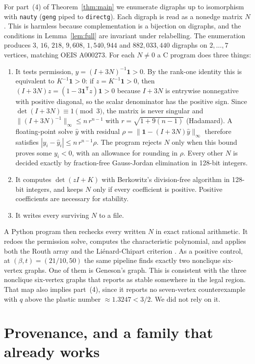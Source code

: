 \documentclass[11pt]{amsart}
\theoremstyle{remark}
\newcommand{\one}{\mathbf 1}
\begin{document}
For part~(4) of Theorem~\ref{thm:main} we enumerate digraphs up to isomorphism with \texttt{nauty} (\texttt{geng} piped to \texttt{directg}). Each digraph is read as a nonedge matrix $N$. This is harmless because complementation is a bijection on digraphs, and the conditions in Lemma~\ref{lem:full} are invariant under relabelling. The enumeration produces $3$, $16$, $218$, $9{,}608$, $1{,}540{,}944$ and $882{,}033{,}440$ digraphs on $2,\dots,7$ vertices, matching OEIS A000273. For each $N\neq0$ a C program does three things:
\begin{enumerate}
\item It tests permission, $y=(I+3N)^{-1}\one>0$. By the rank-one identity this is equivalent to $K^{-1}\one>0$: if $z=K^{-1}\one>0$, then $(I+3N)z=(1-3\one^{\mathsf T}z)\one>0$ because $I+3N$ is entrywise nonnegative with positive diagonal, so the scalar denominator has the positive sign. Since $\det(I+3N)\equiv1\pmod3$, the matrix is never singular and $\|(I+3N)^{-1}\|_\infty\le n\,r^{n-1}$ with $r=\sqrt{1+9(n-1)}$ (Hadamard). A floating-point solve $\hat y$ with residual $\rho=\|\one-(I+3N)\hat y\|_\infty$ therefore satisfies $|y_i-\hat y_i|\le n\,r^{n-1}\rho$. The program rejects $N$ only when this bound proves some $y_i<0$, with an allowance for rounding in $\rho$. Every other $N$ is decided exactly by fraction-free Gauss-Jordan elimination in 128-bit integers.
\item It computes $\det(zI+K)$ with Berkowitz's division-free algorithm \cite{Berkowitz1984} in 128-bit integers, and keeps $N$ only if every coefficient is positive. Positive coefficients are necessary for stability.
\item It writes every surviving $N$ to a file.
\end{enumerate}
A Python program then rechecks every written $N$ in exact rational arithmetic. It redoes the permission solve, computes the characteristic polynomial, and applies both the Routh array and the Li\'enard-Chipart criterion \cite{Gantmacher1959}. \SCANSUMMARY{} As a positive control, at $(\beta,t)=(21/10,50)$ the same pipeline finds exactly two nonclique six-vertex graphs. One of them is Geneson's graph. This is consistent with the three nonclique six-vertex graphs that \cite{CLTNrepo} reports as stable somewhere in the legal region. That map also implies part~(4), since it reports no seven-vertex counterexample with $q$ above the plastic number $\approx1.3247<3/2$. We did not rely on it.

\section{Provenance, and a family that already works}\label{sec:provenance}
\end{document}
